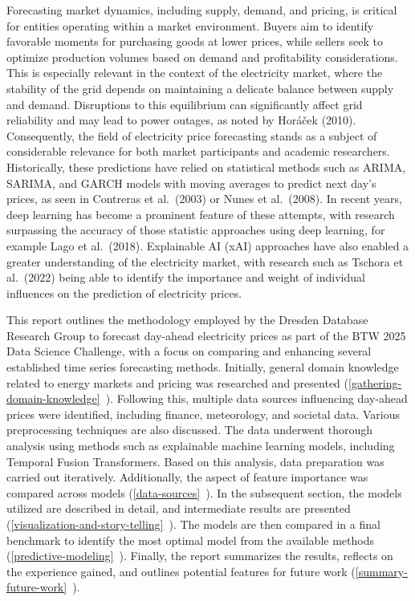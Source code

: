 \documentclass[a4paper]{article}
\begin{document}
    Forecasting market dynamics, including supply, demand, and pricing, is
critical for entities operating within a market environment. Buyers aim
to identify favorable moments for purchasing goods at lower prices,
while sellers seek to optimize production volumes based on demand and
profitability considerations. This is especially relevant in the context
of the electricity market, where the stability of the grid depends on
maintaining a delicate balance between supply and demand. Disruptions to
this equilibrium can significantly affect grid reliability and may lead
to power outages, as noted by Horáček (2010). Consequently, the field of
electricity price forecasting stands as a subject of considerable
relevance for both market participants and academic researchers.
Historically, these predictions have relied on statistical methods such
as ARIMA, SARIMA, and GARCH models with moving averages to predict next
day's prices, as seen in Contreras et al.~(2003) or Nunes et al.~(2008).
In recent years, deep learning has become a prominent feature of these
attempts, with research surpassing the accuracy of those statistic
approaches using deep learning, for example Lago et al.~(2018).
Explainable AI (xAI) approaches have also enabled a greater
understanding of the electricity market, with research such as Tschora
et al.~(2022) being able to identify the importance and weight of
individual influences on the prediction of electricity prices.

This report outlines the methodology employed by the Dresden Database
Research Group to forecast day-ahead electricity prices as part of the
BTW 2025 Data Science Challenge, with a focus on comparing and enhancing
several established time series forecasting methods. Initially, general
domain knowledge related to energy markets and pricing was researched
and presented (\ref{gathering-domain-knowledge}~). Following this, multiple
data sources influencing day-ahead prices were identified, including
finance, meteorology, and societal data. Various preprocessing
techniques are also discussed. The data underwent thorough analysis
using methods such as explainable machine learning models, including
Temporal Fusion Transformers. Based on this analysis, data preparation
was carried out iteratively. Additionally, the aspect of feature
importance was compared across models (\ref{data-sources}~). In the
subsequent section, the models utilized are described in detail, and
intermediate results are presented (\ref{visualization-and-story-telling}~).
The models are then compared in a final benchmark to identify the most
optimal model from the available methods (\ref{predictive-modeling}~).
Finally, the report summarizes the results, reflects on the experience
gained, and outlines potential features for future work (\ref{summary-future-work}~).
\end{document}
